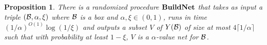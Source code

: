 \documentclass{acmsmall}
\newtheorem{prop}[theorem]{Proposition}
\newcommand{\cB}{{\cal B}}
\newcommand{\Prop}[1]{\hyperref[prop:#1]{Prop.~\ref*{prop:#1}}} %
\newcommand{\gridprec}{\alpha}
\newcommand{\neterror}{\xi}
\newcommand{\netprec}{\alpha}
\newcommand{\approxlis}{{\rm {\bf ApproxLIS}}}
\newcommand{\buildnet}{{\rm {\bf BuildNet}}}
\begin{document}

% 
\begin{prop}
\label{prop:buildnet}
There is a randomized procedure $\buildnet$ that takes
as input a triple $(\cB,\netprec,\neterror)$ where $\cB$ is a box
and $\netprec,\neterror \in (0,1)$, runs in time $(1/\netprec)^{O(1)}\log(1/\neterror)$ and outputs 
a subset $V$ of $Y(\cB)$ of size at most $4\lceil 1/\gridprec \rceil$
such that with probability at least $1-\neterror$, $V$  is a $\netprec$-value net for $\cB$. 
\end{prop}
\end{document}
